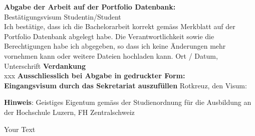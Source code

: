 \documentclass[10.5pt]{article}
\begin{document}
\newpage
\noindent
\textbf{Abgabe der Arbeit auf der Portfolio Datenbank:}\\
Best\"atigungsvisum Studentin/Student\\
Ich best\"atige, dass ich die Bachelorarbeit korrekt gem\"ass Merkblatt auf der Portfolio Datenbank abgelegt habe. Die Verantwortlichkeit sowie die Berechtigungen habe ich abgegeben, so dass ich keine \"Anderungen mehr vornehmen kann oder weitere Dateien hochladen kann. \newline \newline 
Ort / Datum, Unterschrift	\underline{\hspace*{4cm}} \newline \newline \newline
\textbf{Verdankung}\\
{\color{red}xxx} \newline \newline \newline
\noindent
{\textbf{Ausschliesslich bei Abgabe in gedruckter Form: \\
Eingangsvisum durch das Sekretariat auszuf\"ullen}} \newline \newline
Rotkreuz, den	\underline{\hspace*{4cm}} \hspace*{1cm}	Visum:	\underline{\hspace*{4cm}} \vspace*{10cm}











\noindent
{\textbf{Hinweis}}: Geistiges Eigentum gem\"ass der Studienordnung für die Ausbildung an der Hochschule Luzern, FH Zentralschweiz

\newpage
{}
{\color{red}Your Text}
\end{document}
